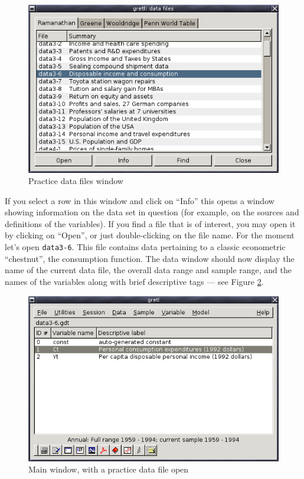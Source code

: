 \begin{figure}[htbp]
  \caption{Practice data files window}
  \label{fig-datafiles}
  \begin{center}
    \includegraphics[scale=0.5]{figures/datafiles}
  \end{center}
\end{figure}

If you select a row in this window and click on ``Info'' this opens a
window showing information on the data set in question (for example,
on the sources and definitions of the variables).  If you find a file
that is of interest, you may open it by clicking on ``Open'', or just
double-clicking on the file name. For the moment let's open
\verb+data3-6+.    This file contains data pertaining to a classic
econometric ``chestnut'', the consumption function.  The data window
should now display the name of the current data file, the overall data
range and sample range, and the names of the variables along with
brief descriptive tags --- see Figure \ref{fig-mainwin}.
    
\begin{figure}[htbp]
  \caption{Main window, with a practice data file open}
  \label{fig-mainwin}
  \begin{center}
    \includegraphics[scale=0.5]{figures/mainwin}
  \end{center}
\end{figure}

